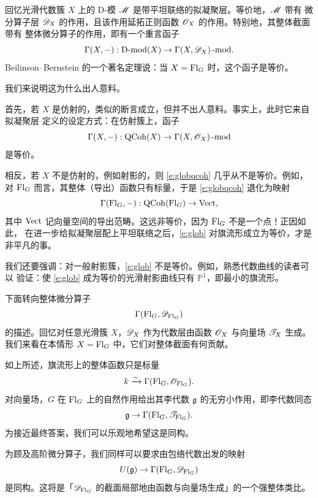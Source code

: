 \ssszh 回忆光滑代数簇 $X$ 上的 D-模 $\mathscr{M}$ 是带平坦联络的拟凝聚层。等价地，$\mathscr{M}$ 带有
微分算子层 $\mathscr{D}_X$ 的作用，且该作用延拓正则函数 $\mathscr{O}_X$ 的作用。特别地，其整体截面带有
整体微分算子的作用，即有一个重言函子
%
\begin{equation} \label{e:glob}
\Gamma(X, -): \operatorname{D-mod}(X) \rightarrow \Gamma(X, \mathscr{D}_X)\operatorname{-mod.}
\end{equation}
%
Beilinson--Bernstein 的一个著名定理说：当 $X = \operatorname{Fl}_G$ 时，这个函子是等价。

\ssszh 我们来说明这为什么出人意料。

首先，若 $X$ 是仿射的，类似的断言成立，但并不出人意料。事实上，此时它来自拟凝聚层
定义的设定方式：在仿射簇上，函子
%
\begin{equation} \label{e:globqcoh}
\Gamma(X, -): \operatorname{QCoh}(X) \rightarrow \Gamma(X, \mathscr{O}_X)\operatorname{-mod}
\end{equation}
%
是等价。

相反，若 $X$ 不是仿射的，例如射影的，则 \eqref{e:globqcoh} 几乎从不是等价。例如，
对 $\operatorname{Fl}_G$ 而言，其整体（导出）函数只有标量，于是 \eqref{e:globqcoh} 退化为映射
%
\[
\Gamma(\operatorname{Fl}_G, -): \operatorname{QCoh}(\operatorname{Fl}_G) \rightarrow \operatorname{Vect,}
\]
%
其中 $\operatorname{Vect}$ 记向量空间的导出范畴。这远非等价，因为 $\operatorname{Fl}_G$ 不是一个点！正因如此，
在进一步给拟凝聚层配上平坦联络之后，\eqref{e:glob} 对旗流形成立为等价，才是非平凡的事。

我们还要强调：对一般射影簇，\eqref{e:glob} 不是等价。例如，熟悉代数曲线的读者可以
验证：使 \eqref{e:glob} 成为等价的光滑射影曲线只有 $\mathbb{P}^1$，即最小的旗流形。

\ssszh 下面转向整体微分算子
%
\[
\Gamma(\operatorname{Fl}_G, \mathscr{D}_{\operatorname{Fl}_G})
\]
%
的描述。回忆对任意光滑簇 $X$，$\mathscr{D}_{X}$ 作为代数层由函数 $\mathscr{O}_X$ 与向量场 $\mathscr{T}_X$
生成。我们来看在本情形 $X = \operatorname{Fl}_G$ 中，它们对整体截面有何贡献。

如上所述，旗流形上的整体函数只是标量
%
\[
k \xrightarrow{\sim} \Gamma(\operatorname{Fl}_G, \mathscr{O}_{\operatorname{Fl}_G}).
\]
%
对向量场，$G$ 在 $\operatorname{Fl}_G$ 上的自然作用给出其李代数 $\mathfrak{g}$ 的无穷小作用，即李代数同态
%
\begin{equation}\label{e:vecfields}
\mathfrak{g} \rightarrow \Gamma(\operatorname{Fl}_G, \mathscr{T}_{\operatorname{Fl}_G}).
\end{equation}
%
为接近最终答案，我们可以乐观地希望这是同构。

为顾及高阶微分算子，我们同样可以要求由包络代数出发的映射
%
\begin{equation}\label{e:globdiff}
U(\mathfrak{g}) \rightarrow \Gamma(\operatorname{Fl}_G, \mathscr{D}_{\operatorname{Fl}_G})
\end{equation}
%
是同构。这将是「$\mathscr{D}_{\operatorname{Fl}_G}$ 的截面局部地由函数与向量场生成」的一个强整体类比。


